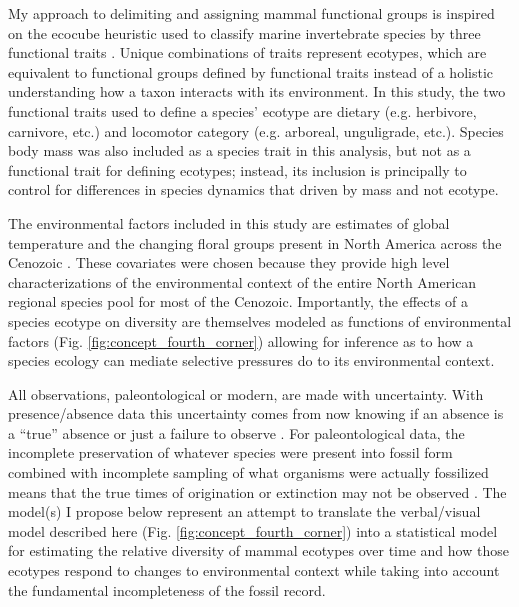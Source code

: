 \documentclass[12pt,letterpaper]{article}
\begin{document}
My approach to delimiting and assigning mammal functional groups is inspired on the ecocube heuristic used to classify marine invertebrate species by three functional traits \citep{Bush2007,Bambach2007,Bush2011,Bush2012b,Novack-Gottshall2007,Villeger2011}. Unique combinations of traits represent ecotypes, which are equivalent to functional groups defined by functional traits instead of a holistic understanding how a taxon interacts with its environment. In this study, the two functional traits used to define a species' ecotype are dietary (e.g. herbivore, carnivore, etc.) and locomotor category (e.g. arboreal, unguligrade, etc.). Species body mass was also included as a species trait in this analysis, but not as a functional trait for defining ecotypes; instead, its inclusion is principally to control for differences in species dynamics that driven by mass and not ecotype.

The environmental factors included in this study are estimates of global temperature and the changing floral groups present in North America across the Cenozoic \citep{Cramer2011,Graham2011a}. These covariates were chosen because they provide high level characterizations of the environmental context of the entire North American regional species pool for most of the Cenozoic. Importantly, the effects of a species ecotype on diversity are themselves modeled as functions of environmental factors (Fig. \ref{fig:concept_fourth_corner}) allowing for inference as to how a species ecology can mediate selective pressures do to its environmental context. 

All observations, paleontological or modern, are made with uncertainty. With presence/absence data this uncertainty comes from now knowing if an absence is a ``true'' absence or just a failure to observe \citep{Royle2008,Royle2005,Foote1999a,Foote2001,Lloyd2011,Wang2016b}. For paleontological data, the incomplete preservation of whatever species were present into fossil form combined with incomplete sampling of what organisms were actually fossilized means that the true times of origination or extinction may not be observed \citep{Foote1999a,Foote2001,Wang2015,Wang2016b}. The model(s) I propose below represent an attempt to translate the verbal/visual model described here (Fig. \ref{fig:concept_fourth_corner}) into a statistical model for estimating the relative diversity of mammal ecotypes over time and how those ecotypes respond to changes to environmental context while taking into account the fundamental incompleteness of the fossil record.
\end{document}
